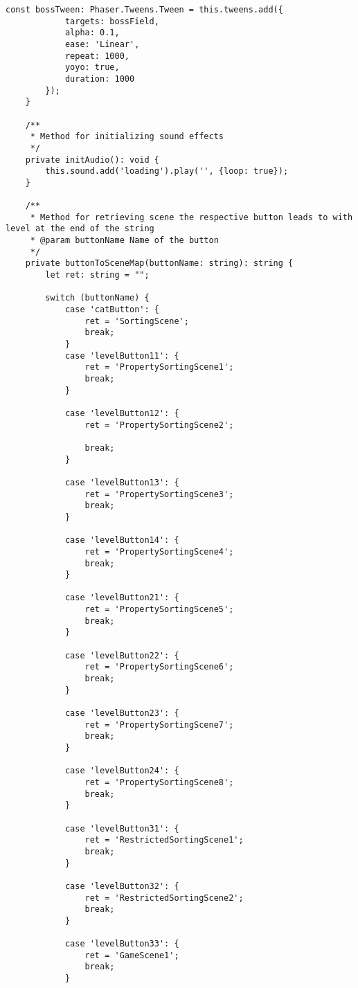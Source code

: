 \begin{lstlisting}[style=TypeScript, caption={levelMenuScene.ts}]
        const bossTween: Phaser.Tweens.Tween = this.tweens.add({
            targets: bossField,
            alpha: 0.1,
            ease: 'Linear',
            repeat: 1000,
            yoyo: true,
            duration: 1000
        });
    }

    /**
     * Method for initializing sound effects
     */
    private initAudio(): void {
        this.sound.add('loading').play('', {loop: true});
    }

    /**
     * Method for retrieving scene the respective button leads to with level at the end of the string
     * @param buttonName Name of the button
     */
    private buttonToSceneMap(buttonName: string): string {
        let ret: string = "";

        switch (buttonName) {
            case 'catButton': {
                ret = 'SortingScene';
                break;
            }
            case 'levelButton11': {
                ret = 'PropertySortingScene1';
                break;
            }

            case 'levelButton12': {
                ret = 'PropertySortingScene2';

                break;
            }

            case 'levelButton13': {
                ret = 'PropertySortingScene3';
                break;
            }

            case 'levelButton14': {
                ret = 'PropertySortingScene4';
                break;
            }

            case 'levelButton21': {
                ret = 'PropertySortingScene5';
                break;
            }

            case 'levelButton22': {
                ret = 'PropertySortingScene6';
                break;
            }

            case 'levelButton23': {
                ret = 'PropertySortingScene7';
                break;
            }

            case 'levelButton24': {
                ret = 'PropertySortingScene8';
                break;
            }

            case 'levelButton31': {
                ret = 'RestrictedSortingScene1';
                break;
            }

            case 'levelButton32': {
                ret = 'RestrictedSortingScene2';
                break;
            }

            case 'levelButton33': {
                ret = 'GameScene1';
                break;
            }


\end{lstlisting}
